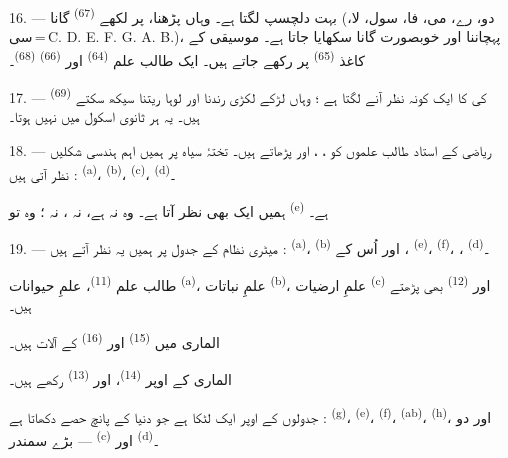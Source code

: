 16. ---  بہت دلچسپ لگتا ہے۔ وہاں
 پڑھنا،  پر لکھے
 \textsuperscript{(67)} گانا (دو، رے، می، فا، سول، لا،
سی\,=\,C. D. E. F. G. A. B.)،  پہچاننا اور خوبصورت
 گانا سکھایا جاتا ہے۔ موسیقی کے کاغذ 
\textsuperscript{(65)} پر رکھے جاتے ہیں۔ ایک طالب علم  \textsuperscript{(64)} اور 
\textsuperscript{(66)}  \textsuperscript{(68)}۔

17. ---  \textsuperscript{(69)} کی  کا
ایک کونہ نظر آنے لگتا ہے ؛ وہاں لڑکے لکڑی رندنا اور لوہا ریتنا سیکھ
سکتے ہیں۔ یہ ہر ثانوی اسکول میں نہیں ہوتا۔

\VUsaut{5.0mm}
\VUsaut{3.6mm}

18. --- ریاضی کے استاد طالب علموں کو ، ،
 اور  پڑھاتے ہیں۔ تختۂ سیاہ پر ہمیں
اہم ہندسی شکلیں نظر آتی ہیں :  \textsuperscript{(a)}،
 \textsuperscript{(b)}،  \textsuperscript{(c)}،
 \textsuperscript{(d)}۔

ہمیں ایک  بھی نظر آتا ہے۔ وہ نہ  ہے، نہ
، نہ  ؛ وہ تو 
\textsuperscript{(e)} ہے۔

19. --- میٹری نظام کے جدول پر ہمیں یہ نظر آتے ہیں : 
\textsuperscript{(a)}،  \textsuperscript{(b)} اور اُس کے
،  \textsuperscript{(e)}، 
\textsuperscript{(f)}، ، 
\textsuperscript{(d)}۔

طالب علم  \textsuperscript{(11)}، علمِ حیوانات
\textsuperscript{(a)}، علمِ نباتات \textsuperscript{(b)}، علمِ ارضیات
\textsuperscript{(c)} اور  \textsuperscript{(12)} بھی
پڑھتے ہیں۔

الماری میں  \textsuperscript{(15)} اور
 \textsuperscript{(16)} کے آلات ہیں۔

الماری کے اوپر  \textsuperscript{(14)}،  اور
 \textsuperscript{(13)} رکھے ہیں۔

جدولوں کے اوپر ایک  لٹکا ہے جو دنیا کے پانچ حصے دکھاتا
ہے :  \textsuperscript{(g)}، 
\textsuperscript{(e)}،  \textsuperscript{(f)}،
 \textsuperscript{(ab)}، 
\textsuperscript{(h)}، اور دو بڑے سمندر — 
\textsuperscript{(c)} اور  \textsuperscript{(d)}۔

\VUsaut{6.0mm}
\VUfilet{22mm}
